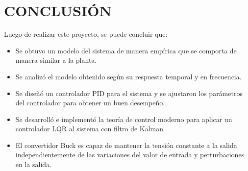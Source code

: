 \section{\large{CONCLUSIÓN}}
\vspace{-0.5cm}
\justifying

Luego de realizar este proyecto, se puede concluir que:

\begin{itemize}[noitemsep]
    \item Se obtuvo un modelo del sistema de manera empírica que se comporta de manera similar a la planta.
    \item Se analizó el modelo obtenido según su respuesta temporal y en frecuencia.
    \item Se diseñó un controlador PID para el sistema y se ajustaron los parámetros del controlador para obtener un buen desempeño.
    \item Se desarrolló e implementó la teoría de control moderno para aplicar un controlador LQR al sistema con filtro de Kalman
    \item El convertidor Buck es capaz de mantener la tensión constante a la salida independientemente de las variaciones del valor de entrada
    y perturbaciones en la salida.
\end{itemize}